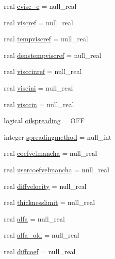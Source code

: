 \begin{DoxyCompactItemize}
\item 
real \mbox{\hyperlink{structmoduleoil__0d_1_1t__var_a83bd7414ec9e9238eccdc5e7fbedb312}{cvisc\+\_\+e}} = null\+\_\+real
\item 
real \mbox{\hyperlink{structmoduleoil__0d_1_1t__var_acca8b7dcd205a6da50548ff2daf14987}{viscref}} = null\+\_\+real
\item 
real \mbox{\hyperlink{structmoduleoil__0d_1_1t__var_a06870ffc73d82b2901f5c2a3c94cd665}{tempviscref}} = null\+\_\+real
\item 
real \mbox{\hyperlink{structmoduleoil__0d_1_1t__var_a2e3edebd324f8c545bf0da76123b86ad}{denstempviscref}} = null\+\_\+real
\item 
real \mbox{\hyperlink{structmoduleoil__0d_1_1t__var_a31bb80e9ad3825231ab06eefa9d62ce4}{visccinref}} = null\+\_\+real
\item 
real \mbox{\hyperlink{structmoduleoil__0d_1_1t__var_afb9688cf99434781c16cb6804a12812b}{viscini}} = null\+\_\+real
\item 
real \mbox{\hyperlink{structmoduleoil__0d_1_1t__var_a57d7a063f373e40e4b2f8fa3deac054b}{visccin}} = null\+\_\+real
\item 
logical \mbox{\hyperlink{structmoduleoil__0d_1_1t__var_a8da3415200b19d49ef42237a0f03f98a}{oilspreading}} = O\+FF
\item 
integer \mbox{\hyperlink{structmoduleoil__0d_1_1t__var_af4935d72e8a28b0f7d63e66fda22d26d}{spreadingmethod}} = null\+\_\+int
\item 
real \mbox{\hyperlink{structmoduleoil__0d_1_1t__var_a4de180fefe5e743001c9b2912cbd9209}{coefvelmancha}} = null\+\_\+real
\item 
real \mbox{\hyperlink{structmoduleoil__0d_1_1t__var_a93c0671c953128bd38f80b1b322d1d2b}{usercoefvelmancha}} = null\+\_\+real
\item 
real \mbox{\hyperlink{structmoduleoil__0d_1_1t__var_a85a5ea50e8d1734aa3aca3b5e798c03a}{diffvelocity}} = null\+\_\+real
\item 
real \mbox{\hyperlink{structmoduleoil__0d_1_1t__var_a3d53380c6816063b1e8aead3593f80b1}{thicknesslimit}} = null\+\_\+real
\item 
real \mbox{\hyperlink{structmoduleoil__0d_1_1t__var_acf71159f121382ae5067270d90aaf10c}{alfa}} = null\+\_\+real
\item 
real \mbox{\hyperlink{structmoduleoil__0d_1_1t__var_a37ef93d8b59b55aaa5930acc576fe68f}{alfa\+\_\+old}} = null\+\_\+real
\item 
real \mbox{\hyperlink{structmoduleoil__0d_1_1t__var_ad38ac97804aa7c6587b759d72af4b544}{diffcoef}} = null\+\_\+real

\end{DoxyCompactItemize}

